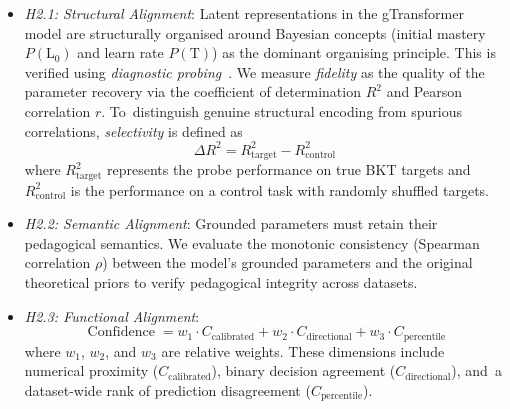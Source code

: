 \documentclass[applsci,article,accept,moreauthors,pdftex]{Definitions/mdpi}
\begin{document}
\begin{itemize}
\item \textit{H2.1: Structural Alignment}: %
Latent representations in the gTransformer model are structurally organised around Bayesian concepts (initial mastery $P(\text{L}_0)$ and learn rate $P(\text{T})$) as the dominant organising principle. This is verified using \textit{diagnostic probing}~\citep{hewitt2019designing, belinkov2022probing}. We measure \textit{fidelity} as the quality of the parameter recovery via the coefficient of determination $R^2$ and Pearson correlation $r$. To~distinguish genuine structural encoding from spurious correlations, \textit{selectivity} is defined as
\begin{equation} \label{eq:selectivity}
    \Delta R^2 = R^2_{\text{target}} - R^2_{\text{control}}
    \end{equation}
where $R^2_{\text{target}}$ represents the probe performance on true BKT targets and $R^2_{\text{control}}$ is the performance on a control task with randomly shuffled targets.
    \item \textit{H2.2: Semantic Alignment}: Grounded parameters must retain their pedagogical semantics. We evaluate the monotonic consistency (Spearman correlation $\rho$) between the model's grounded parameters and the original theoretical priors to verify pedagogical integrity across datasets.
    \item \textit{H2.3: Functional Alignment}: 
\begin{equation} \label{eq:confidence}
    \operatorname{Confidence} = w_1 \cdot C_{\text{calibrated}} + w_2 \cdot C_{\text{directional}} + w_3 \cdot C_{\text{percentile}}
    \end{equation}
where $w_1$, $w_2$, and $w_3$ are relative weights. These dimensions include numerical proximity ($C_{\text{calibrated}}$), binary decision agreement ($C_{\text{directional}}$), and~a dataset-wide rank of prediction disagreement ($C_{\text{percentile}}$).
\end{itemize}
\end{document}
